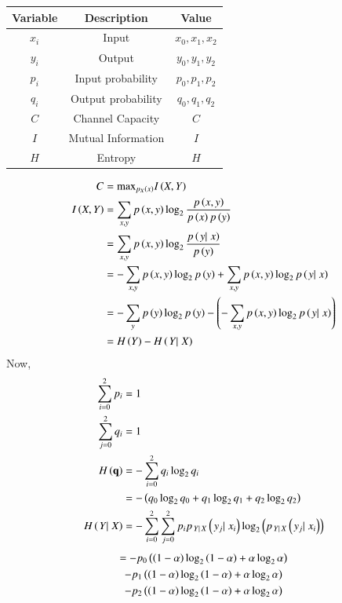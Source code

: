 \documentclass[journal,12pt,twocolumn]{IEEEtran}
\theoremstyle{remark}
\begin{document}
\begin{tabular}{|c|c|c|} \hline
Variable & Description & Value\\\hline
$x_i$ & Input & $x_0 , x_1, x_2$\\\hline
$y_i$ & Output & $y_0 , y_1, y_2$\\\hline
$p_i$ & Input probability & $ p_0, p_1, p_2 $\\\hline
$q_i$ & Output probability & $  q_0, q_1, q_2 $\\\hline
$C$ & Channel Capacity & $C$\\\hline
$I$ & Mutual Information & $I$ \\\hline
$H$ & Entropy & $H$ \\\hline
\end{tabular}
\begin{align}
C &=\text{max}_{p_X\left(x\right)} I\left(X,Y\right)\\
I\left(X,Y\right) &= \sum_{x,y}p\left(x,y\right)\log_2\frac{p\left(x,y\right)}{p\left(x\right)p\left(y\right)}\\
&= \sum_{x,y}p\left(x,y\right)\log_2\frac{p\left(\left.{y}|\right.{x}\right)}{p\left(y\right)}\\
&=-\sum_{x,y}p\left(x,y\right)\log_2p\left(y\right)+\sum_{x,y}p\left(x,y\right)\log_2p\left(\left.{y}|\right.{x}\right)\\
&=-\sum_{y}p\left(y\right)\log_2p\left(y\right)-\left(-\sum_{x,y}p\left(x,y\right)\log_2p\left(\left.{y}|\right.{x}\right)\right)\\
&= H\left(Y\right) - H\left(\left.{Y}|\right.{X}\right)\label{eq:1}
\end{align}
Now,
\begin{align}
\sum_{i=0}^2p_i&=1\\
 \sum_{j=0}^2q_i&=1\\
H\left(\mathbf{q}\right) &= - \sum_{i=0}^2 q_i\log_2 q_i\\
&= -\left(q_0\log_2 q_0 + q_1\log_2 q_1 +q_2\log_2 q_2\right)\label{eq:2}\\
H\left(\left.{Y}|\right.{X}\right) &= -\sum_{i=0}^2 \sum_{j=0}^2p_ip_{\left.{Y}|\right.{X}}\left({\left.{y_j}|\right.{x_i}}\right)\log_2\left(p_{\left.{Y}|\right.{X}}\left({\left.{y_j}|\right.{x_i}}\right)\right)
\end{align}
\begin{multline}
= -p_0\left(\left(1-\alpha\right) \log_2 \left(1-\alpha\right) + \alpha \log_2 \alpha\right)\\-p_1\left(\left(1-\alpha\right) \log_2 \left(1-\alpha\right) + \alpha \log_2 \alpha\right)\\-p_2\left(\left(1-\alpha\right) \log_2 \left(1-\alpha\right) + \alpha \log_2 \alpha\right)\label{eq:3}
\end{multline}
\end{document}
